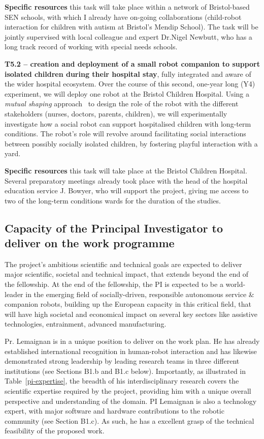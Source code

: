 \textbf{Specific resources} this task will take place within a network of
Bristol-based SEN schools, with which I already have on-going collaborations
(child-robot interaction for children with autism at Bristol's Mendip School).
The task will be jointly supervised with local colleague and expert Dr.Nigel Newbutt,
who has a long track record of working with special needs schools.


\textbf{T5.2 -- creation and deployment of a small robot companion to support
isolated children during their hospital stay}, fully integrated and aware of the
wider hospital ecosystem. Over the course of this second, one-year long (Y4)
experiment, we will deploy one \project robot at the Bristol Children Hospital.
Using a \emph{mutual shaping} approach~\cite{winkle2018social} to design the
role of the robot with the different stakeholders (nurses, doctors, parents,
children), we will experimentally investigate how a social robot can support
hospitalised children with long-term conditions. The robot's role will revolve
around facilitating social interactions between possibly socially isolated
children, by fostering playful interaction with a yard.

\textbf{Specific resources} this task will take place at the Bristol Children
Hospital. Several preparatory meetings already took place with the head of the
hospital education service J. Bowyer, who will support the project, giving me
access to two of the long-term conditions wards for the duration of the studies.


\subsection{Capacity of the Principal Investigator to deliver on the work programme}

The project's ambitious scientific and technical goals are expected to deliver
major scientific, societal and technical impact, that extends beyond the end of
the fellowship. At the end of the fellowship, the PI is expected to be a
world-leader in the emerging field of socially-driven, responsible autonomous
service \& companion robots, building up the European capacity in this critical
field, that will have high societal and economical impact on several key sectors
like assistive technologies, entrainment, advanced manufacturing.

Pr. Lemaignan is in a unique position to deliver on the \project work plan.  He
has already established international recognition in human-robot interaction and
has likewise demonstrated strong leadership by leading research teams in three
different institutions (see Sections B1.b and B1.c below). Importantly, as
illustrated in Table~\ref{pi-expertise}, the breadth of
his interdisciplinary research covers the scientific expertise required by the
project, providing him with a unique overall perspective and understanding of
the domain. PI Lemaignan is also a technology expert, with major software and
hardware contributions to the robotic community (see Section B1.c). As such, he
has a excellent grasp of the technical feasibility of the proposed work.


